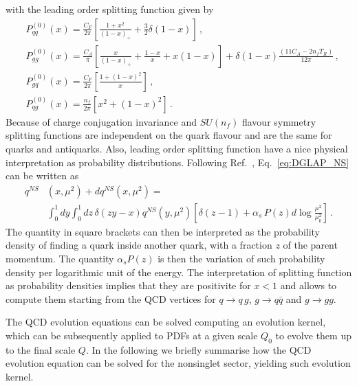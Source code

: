 with the leading order splitting function given by
\begin{align}
    &P_{qq}^{(0)}\left(x\right) = \frac{C_F}{2\pi}\left[\frac{1+x^2}{\left(1-x\right)_+} 
    + \frac{3}{2}\delta\left(1-x\right)\right]\,,\nonumber \\
    &P_{gg}^{(0)}\left(x\right) = \frac{C_A}{\pi}\left[\frac{x}{\left(1-x\right)_+}
    + \frac{1-x}{x} + x\left(1-x\right)\right] 
    +\delta\left(1-x\right)\frac{\left(11C_A - 2n_f T_R\right)}{12\pi}\,, \nonumber \\
    &P_{gq}^{(0)}\left(x\right) = \frac{C_F}{2\pi}\left[\frac{1+\left(1-x\right)^2}{x}\right]\,, \nonumber \\
    &P_{qg}^{(0)}\left(x\right) = \frac{n_f}{2\pi}\left[x^2+\left(1-x\right)^2\right]\,.
\end{align}
Because of charge conjugation invariance and $SU(n_f)$ flavour symmetry splitting functions are independent on the quark
flavour and are the same for quarks and antiquarks. 
Also, leading order splitting function have a nice physical interpretation as probability distributions.
Following Ref.~\cite{ALTARELLI1977298}, Eq.~\ref{eq:DGLAP_NS} can be written as
\begin{align}
    q^{NS}&\left(x,\mu^2\right) + dq^{NS}\left(x,\mu^2\right) = \nonumber\\
    &\int_0^1 dy\int_0^1 dz\,\delta\left(zy-x\right) q^{NS}\left(y,\mu^2\right) 
    \left[\delta\left(z-1\right) + \alpha_s\, P\left(z\right) d \log\frac{\mu^2}{\mu_0^2}\right]\,.
\end{align}
The quantity in square brackets can then be interpreted as the probability density of finding a quark
inside another quark, with a fraction $z$ of the parent momentum. The quantity $\alpha_s P\left(z\right)$
is then the variation of such probability density per logarithmic unit of the energy. The interpretation
of splitting function as probability densities implies that they are positivite for $x<1$ and allows to compute
them starting from the QCD vertices for $q\rightarrow q\,g$, $g\rightarrow q\bar{q}$ and $g\rightarrow gg$.  

%
The QCD evolution equations can be solved computing an evolution kernel, which can be subsequently applied
to PDFs at a given scale $Q_0$ to evolve them up to the final scale $Q$.
In the following we briefly summarise how the QCD evolution equation can be solved for the
nonsinglet sector, yielding such evolution kernel.

